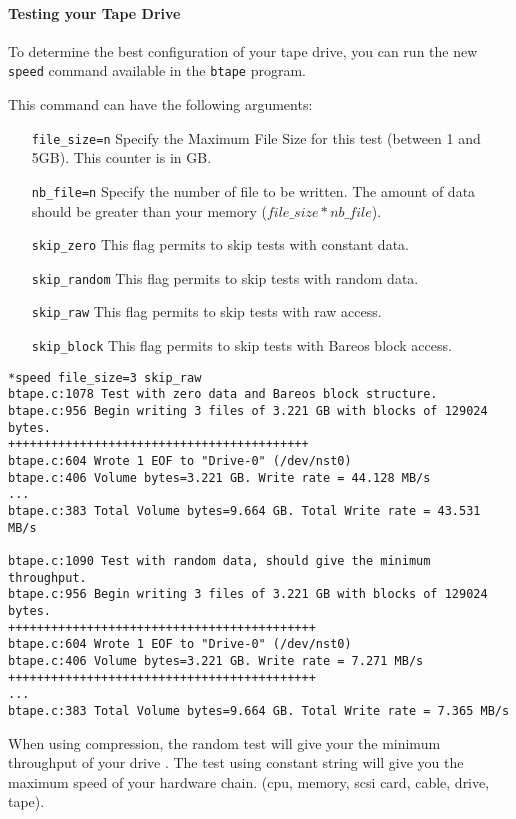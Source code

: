 \paragraph{Testing your Tape Drive}
\label{sec:btapespeed}

To determine the best configuration of your tape drive, you can run the new
\texttt{speed} command available in the \texttt{btape} program.

This command can have the following arguments:
\begin{itemize}
\item[\texttt{file\_size=n}] Specify the Maximum File Size for this test
  (between 1 and 5GB). This counter is in GB.
\item[\texttt{nb\_file=n}] Specify the number of file to be written. The amount
  of data should be greater than your memory ($file\_size*nb\_file$).
\item[\texttt{skip\_zero}] This flag permits to skip tests with constant
  data.
\item[\texttt{skip\_random}] This flag permits to skip tests with random
  data.
\item[\texttt{skip\_raw}] This flag permits to skip tests with raw access.
\item[\texttt{skip\_block}] This flag permits to skip tests with Bareos block
  access.
\end{itemize}

\begin{verbatim}
*speed file_size=3 skip_raw
btape.c:1078 Test with zero data and Bareos block structure.
btape.c:956 Begin writing 3 files of 3.221 GB with blocks of 129024 bytes.
++++++++++++++++++++++++++++++++++++++++++
btape.c:604 Wrote 1 EOF to "Drive-0" (/dev/nst0)
btape.c:406 Volume bytes=3.221 GB. Write rate = 44.128 MB/s
...
btape.c:383 Total Volume bytes=9.664 GB. Total Write rate = 43.531 MB/s

btape.c:1090 Test with random data, should give the minimum throughput.
btape.c:956 Begin writing 3 files of 3.221 GB with blocks of 129024 bytes.
+++++++++++++++++++++++++++++++++++++++++++
btape.c:604 Wrote 1 EOF to "Drive-0" (/dev/nst0)
btape.c:406 Volume bytes=3.221 GB. Write rate = 7.271 MB/s
+++++++++++++++++++++++++++++++++++++++++++
...
btape.c:383 Total Volume bytes=9.664 GB. Total Write rate = 7.365 MB/s
\end{verbatim}

When using compression, the random test will give your the minimum throughput
of your drive . The test using constant string will give you the maximum speed
of your hardware chain. (cpu, memory, scsi card, cable, drive, tape).


